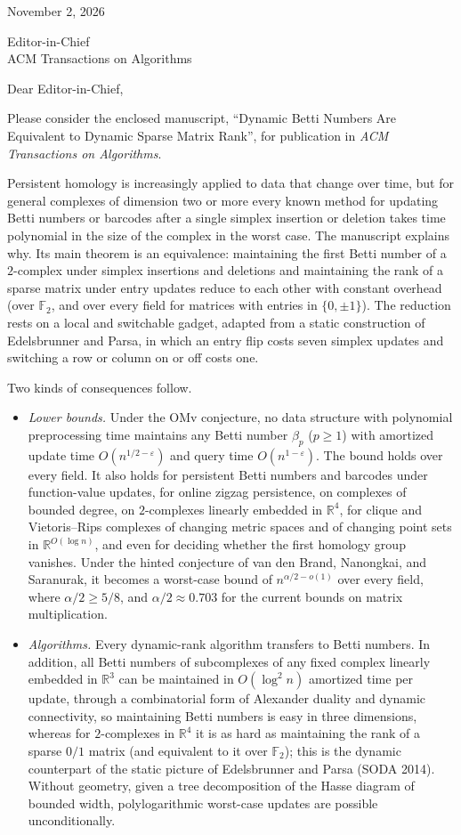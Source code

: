 \documentclass[11pt]{article}
\begin{document}
\hfill November 2, 2026

Editor-in-Chief\\ACM Transactions on Algorithms

Dear Editor-in-Chief,

Please consider the enclosed manuscript, ``Dynamic Betti Numbers Are Equivalent to Dynamic Sparse Matrix Rank'', for publication in \emph{ACM Transactions on Algorithms}.

Persistent homology is increasingly applied to data that change over time, but for general complexes of dimension two or more every known method for updating Betti numbers or barcodes after a single simplex insertion or deletion takes time polynomial in the size of the complex in the worst case. The manuscript explains why. Its main theorem is an equivalence: maintaining the first Betti number of a $2$-complex under simplex insertions and deletions and maintaining the rank of a sparse matrix under entry updates reduce to each other with constant overhead (over $\mathbb{F}_2$, and over every field for matrices with entries in $\{0,\pm1\}$). The reduction rests on a local and switchable gadget, adapted from a static construction of Edelsbrunner and Parsa, in which an entry flip costs seven simplex updates and switching a row or column on or off costs one.

Two kinds of consequences follow.
\begin{itemize}
\item \emph{Lower bounds.} Under the OMv conjecture, no data structure with polynomial preprocessing time maintains any Betti number $\beta_p$ ($p\ge1$) with amortized update time $O(n^{1/2-\varepsilon})$ and query time $O(n^{1-\varepsilon})$. The bound holds over every field. It also holds for persistent Betti numbers and barcodes under function-value updates, for online zigzag persistence, on complexes of bounded degree, on $2$-complexes linearly embedded in $\mathbb{R}^4$, for clique and Vietoris--Rips complexes of changing metric spaces and of changing point sets in $\mathbb{R}^{O(\log n)}$, and even for deciding whether the first homology group vanishes. Under the hinted conjecture of van den Brand, Nanongkai, and Saranurak, it becomes a worst-case bound of $n^{\alpha/2-o(1)}$ over every field, where $\alpha/2\ge5/8$, and $\alpha/2\approx0.703$ for the current bounds on matrix multiplication.
\item \emph{Algorithms.} Every dynamic-rank algorithm transfers to Betti numbers. In addition, all Betti numbers of subcomplexes of any fixed complex linearly embedded in $\mathbb{R}^3$ can be maintained in $O(\log^2 n)$ amortized time per update, through a combinatorial form of Alexander duality and dynamic connectivity, so maintaining Betti numbers is easy in three dimensions, whereas for $2$-complexes in $\mathbb{R}^4$ it is as hard as maintaining the rank of a sparse $0/1$ matrix (and equivalent to it over $\mathbb{F}_2$); this is the dynamic counterpart of the static picture of Edelsbrunner and Parsa (SODA 2014). Without geometry, given a tree decomposition of the Hasse diagram of bounded width, polylogarithmic worst-case updates are possible unconditionally.
\end{itemize}
\end{document}
